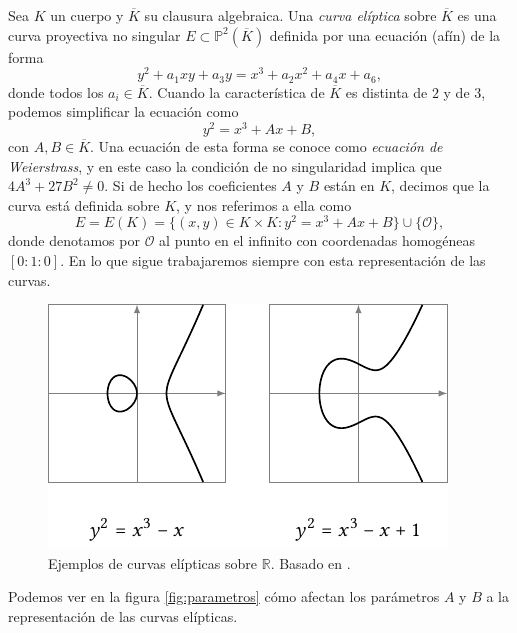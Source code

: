 \documentclass[
  a4paper,
  12pt,
  spanish,
]{scrartcl}
\begin{document}
    Sea $K$ un cuerpo y $\overline{K}$ su clausura algebraica. Una \textit{curva elíptica} sobre $\overline{K}$ es una curva proyectiva no singular $E \subset \mathbb{P}^2(\overline{K})$ definida por una ecuación (afín) de la forma \[ y^2 + a_1xy + a_3y = x^3 +a_2x^2 + a_4x + a_6, \] donde todos los $a_i \in \overline{K}$.
    Cuando la característica de $\overline{K}$ es distinta de $2$ y de $3$, podemos simplificar la ecuación como \[ y^2 = x^3 + Ax + B, \] con $A,B \in \overline{K}$. Una ecuación de esta forma se conoce como \textit{ecuación de Weierstrass}, y en este caso la condición de no singularidad implica que $4A^3 + 27B^2 \neq 0$. Si de hecho los coeficientes $A$ y $B$ están en $K$, decimos que la curva está definida sobre $K$, y nos referimos a ella como \[ E = E(K) = \{ (x, y) \in K \times K : y^2 = x^3 + Ax + B\} \cup \{\mathcal{O}\}, \] donde denotamos por $\mathcal{O}$ al punto en el infinito con coordenadas homogéneas $[0:1:0]$. En lo que sigue trabajaremos siempre con esta representación de las curvas.
    
\begin{figure}[h]
  \centering
  \includegraphics[width=.75\textwidth]{img/ejemplos-curvas}
  \caption{Ejemplos de curvas elípticas sobre $\mathbb{R}$. Basado en \parencite{eichlseder_elliptic_2016}.}
  \label{fig:curva}
\end{figure}

Podemos ver en la figura \ref{fig:parametros} cómo afectan los parámetros $A$ y $B$ a la representación de las curvas elípticas.
\end{document}
